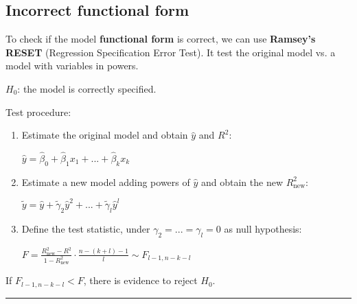 \documentclass[10pt, a4paper, landscape]{extarticle}
\begin{document}
\begin{multicols}{3}
\section*{Incorrect functional form}
	To check if the model \textbf{functional form} is correct, we can use \textbf{Ramsey's RESET} (Regression Specification Error Test). It test the original model vs. a model with variables in powers.
	\begin{center}
		$H_0$: the model is correctly specified.
	\end{center}
	Test procedure:
	\begin{enumerate}[leftmargin=*]
		\item Estimate the original model and obtain $\hat{y}$ and $R^2$:
		\begin{center}
			$\hat{y} = \hat{\beta}_0 + \hat{\beta}_1 x_1 + ... + \hat{\beta}_k x_k$
		\end{center}
		\item Estimate a new model adding powers of $\hat{y}$ and obtain the new $R^2_{\mathrm{new}}$:
		\begin{center}
			$\tilde{y} = \hat{y} + \tilde{\gamma}_2 \hat{y}^2 + ... + \tilde{\gamma}_l \hat{y}^l$
		\end{center}
		\item Define the test statistic, under $\gamma_2 = ... = \gamma_l = 0$ as null hypothesis:
		\begin{center}
			$F = \frac{R^2_{\mathrm{new}} - R^2}{1 - R^2_{\mathrm{new}}} \cdot \frac{n -(k + l) - 1}{l} \sim F_{l-1, n-k-l}$
		\end{center}
	\end{enumerate}
	If $F_{l-1, n-k-l} < F$, there is evidence to reject $H_0$.
\end{multicols}

\noindent\rule{\textwidth}{0.4pt} %
\end{document}
